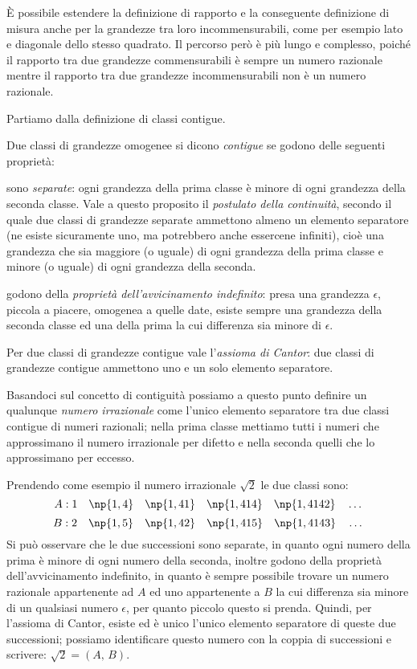 \`E possibile estendere la definizione di rapporto e la conseguente definizione di misura anche per la grandezze tra loro incommensurabili, come per esempio lato e diagonale dello stesso quadrato. Il percorso però è più lungo e complesso, poiché il rapporto tra due grandezze commensurabili è sempre un numero razionale mentre il rapporto tra due grandezze incommensurabili non è un numero razionale.

Partiamo dalla definizione di classi contigue.
\begin{definizione}
Due classi di grandezze omogenee si dicono \emph{contigue} se godono delle seguenti proprietà:
\begin{itemize*}
\item sono \emph{separate}: ogni grandezza della prima classe è minore di ogni grandezza della seconda classe. Vale a questo proposito il \emph{postulato della continuità}, secondo il quale due classi di grandezze separate ammettono almeno un elemento separatore (ne esiste sicuramente uno, ma potrebbero anche essercene infiniti), cioè una grandezza che sia maggiore (o uguale) di ogni grandezza della prima classe e minore (o uguale) di ogni grandezza della seconda.
\item godono della \emph{proprietà dell'avvicinamento indefinito}: presa una grandezza $\epsilon$, piccola a piacere, omogenea a quelle date, esiste sempre una grandezza della seconda classe ed una della prima la cui differenza sia minore di $\epsilon$.
\end{itemize*}
\end{definizione}

Per due classi di grandezze contigue vale l'\emph{assioma di Cantor}: due classi di grandezze contigue ammettono uno e un solo elemento separatore.

Basandoci sul concetto di contiguità possiamo a questo punto definire un qualunque \emph{numero irrazionale} come l'unico elemento separatore tra due classi contigue di numeri razionali; nella prima classe mettiamo tutti i numeri che approssimano il numero irrazionale per difetto e nella seconda quelli che lo approssimano per eccesso.

Prendendo come esempio il numero irrazionale $\sqrt{2}$ le due classi sono:
\[A: 1\quad \np{1,4}\quad \np{1,41}\quad \np{1,414}\quad \np{1,4142}\quad \ldots{}\]
\[B: 2\quad \np{1,5}\quad \np{1,42}\quad \np{1,415}\quad \np{1,4143}\quad \ldots{}\]
Si può osservare che le due successioni sono separate, in quanto ogni numero della prima è minore di ogni numero della seconda, inoltre godono della proprietà dell'avvicinamento indefinito, in quanto è sempre possibile trovare un numero razionale appartenente ad $A$ ed uno appartenente a $B$ la cui differenza sia minore di un qualsiasi numero $\epsilon$, per quanto piccolo questo si prenda.
Quindi, per l'assioma di Cantor, esiste ed è unico l'unico elemento separatore di queste due successioni; possiamo identificare questo numero con la coppia di successioni e scrivere: $\sqrt{2} = (A\text{, }B)$.

